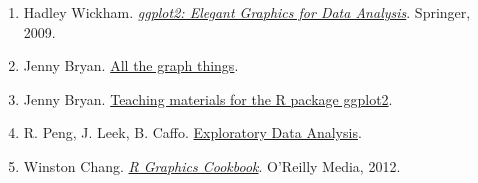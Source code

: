 \documentclass[10pt, oneside]{report}
\begin{document}
\begin{enumerate}[(1)]
\item Hadley Wickham. \href{http://www.amazon.com/ggplot2-Elegant-Graphics-Data-Analysis/dp/0387981403/ref=sr_1_2?ie=UTF8&qid=1461133380&sr=8-2&keywords=ggplot2}{\emph{ggplot2: Elegant Graphics for Data Analysis}}. Springer, 2009.
\item Jenny Bryan. \href{http://stat545.com/graph00_index.html}{All the graph things}.
\item Jenny Bryan. \href{https://github.com/jennybc/ggplot2-tutorial}{Teaching materials for the R package ggplot2}.
\item R. Peng, J. Leek, B. Caffo. \href{https://www.coursera.org/learn/exploratory-data-analysis/}{Exploratory Data Analysis}.
\item Winston Chang. \href{http://www.amazon.com/R-Graphics-Cookbook-Winston-Chang/dp/1449316956/ref=sr_1_3?ie=UTF8&qid=1461135767&sr=8-3&keywords=ggplot2}{\emph{R Graphics Cookbook}}. O'Reilly Media, 2012.
\end{enumerate}

%
%

\newpage

\thispagestyle{empty}
\pagecolor{Olive}\afterpage{\nopagecolor}

\null
\vfill
\end{document}

